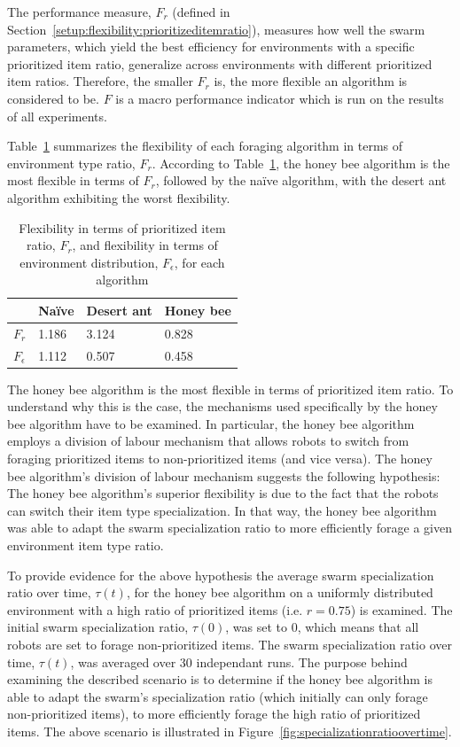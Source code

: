 The performance measure, $F_r$ (defined in Section~\ref{setup:flexibility:prioritizeditemratio}), measures how well the swarm parameters, which yield the best efficiency for environments with a specific prioritized item ratio, generalize across environments with different prioritized item ratios. Therefore, the smaller $F_r$ is, the more flexible an algorithm is considered to be. $F$ is a macro performance indicator which is run on the results of all experiments. 

Table~\ref{table:flexibility} summarizes the flexibility of each foraging algorithm in terms of environment type ratio, $F_r$. According to Table~\ref{table:flexibility}, the honey bee algorithm is the most flexible in terms of $F_r$, followed by the na\"ive algorithm, with the desert ant algorithm exhibiting the worst flexibility. 

 
\begin{table}[!htbp]
\centering
\caption{Flexibility in terms of prioritized item ratio, $F_r$, and flexibility in terms of environment distribution, $F_\epsilon$, for each algorithm}
\label{table:flexibility}
\begin{tabular}{@{}llll@{}}
\toprule
\textbf{}         & Na\"ive         & Desert ant        & Honey bee         \\ \midrule
\textbf{$F_r$}    & 1.186 & 3.124     & 0.828    \\ \midrule
\textbf{$F_\epsilon$} & 1.112 & 0.507 & 0.458 
\end{tabular}
\end{table}

The honey bee algorithm is the most flexible in terms of prioritized item ratio. To understand why this is the case, the mechanisms used specifically by the honey bee algorithm have to be examined. In particular, the honey bee algorithm employs a division of labour mechanism that allows robots to switch from foraging prioritized items to non-prioritized items (and vice versa). The honey bee algorithm's division of labour mechanism suggests the following hypothesis: The honey bee algorithm's superior flexibility is due to the fact that the robots can switch their item type specialization. In that way, the honey bee algorithm was able to adapt the swarm specialization ratio to more efficiently forage a given environment item type ratio.

To provide evidence for the above hypothesis the average swarm specialization ratio over time, $\tau(t)$, for the honey bee algorithm on a uniformly distributed environment with a high ratio of prioritized items (i.e. $r = 0.75$) is examined. The initial swarm specialization ratio, $\tau(0)$, was set to 0, which means that all robots are set to forage non-prioritized items. The swarm specialization ratio over time, $\tau(t)$, was averaged over 30 independant runs. The purpose behind examining the described scenario is to determine if the honey bee algorithm is able to adapt the swarm's specialization ratio (which initially can only forage non-prioritized items), to more efficiently forage the high ratio of prioritized items. The above scenario is illustrated in Figure~\ref{fig:specializationratioovertime}. 


